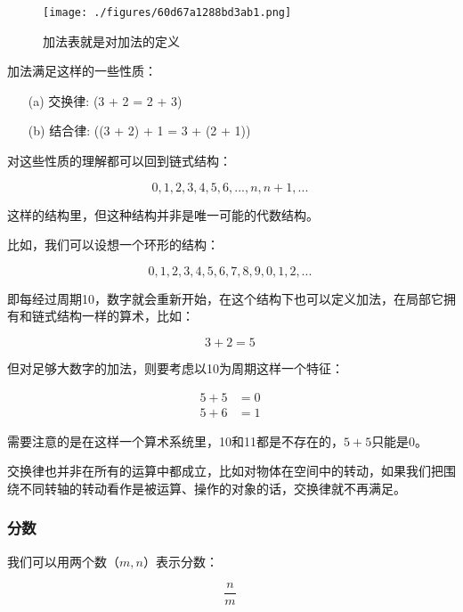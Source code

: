 \begin{figure}[ht]
\centering
\texttt{[image: ./figures/60d67a1288bd3ab1.png]}
\caption{加法表就是对加法的定义} \label{fig_QMPre6_1}
\end{figure}

加法满足这样的一些性质：

\begin{itemize}
    \item [(a)] 交换律: (3 + 2 = 2 + 3)
    \item [(b)] 结合律: ((3 + 2) + 1 = 3 + (2 + 1))
\end{itemize}

对这些性质的理解都可以回到链式结构：

\begin{equation}
0, 1, 2, 3, 4, 5, 6, ..., n, n+1, ...~
\end{equation}

这样的结构里，但这种结构并非是唯一可能的代数结构。

比如，我们可以设想一个环形的结构：

\begin{equation}
0, 1, 2, 3, 4, 5, 6, 7, 8, 9, 0, 1, 2, ...~
\end{equation}

即每经过周期10，数字就会重新开始，在这个结构下也可以定义加法，在局部它拥有和链式结构一样的算术，比如：

\begin{equation}
3 + 2 = 5~
\end{equation}

但对足够大数字的加法，则要考虑以10为周期这样一个特征：

\begin{align}
5+5 & =  0\\
5+6 & =  1 ~
\end{align}

需要注意的是在这样一个算术系统里，10和11都是不存在的，$5+5$只能是0。

交换律也并非在所有的运算中都成立，比如对物体在空间中的转动，如果我们把围绕不同转轴的转动看作是被运算、操作的对象的话，交换律就不再满足。


\subsubsection{分数}

我们可以用两个数（$m,n$）表示分数：

\begin{equation}
\frac{n}{m}~
\end{equation}

